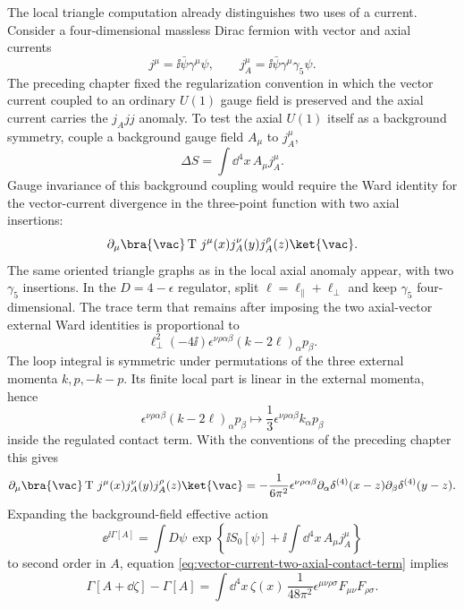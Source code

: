 The local triangle computation already distinguishes two uses of a current.
Consider a four-dimensional massless Dirac fermion with vector and axial
currents
\[
  j^\mu=\ii\bar\psi\gamma^\mu\psi,
  \qquad
  j_A^\mu=\ii\bar\psi\gamma^\mu\gamma_5\psi .
\]
The preceding chapter fixed the regularization convention in which the vector
current coupled to an ordinary \(U(1)\) gauge field is preserved and the axial
current carries the \(j_Ajj\) anomaly.  To test the axial \(U(1)\) itself as a
background symmetry, couple a background gauge field \(A_\mu\) to \(j_A^\mu\),
\[
  \Delta S=\int\dd^4x\,A_\mu j_A^\mu .
\]
Gauge invariance of this background coupling would require the Ward identity
for the vector-current divergence in the three-point function with two axial
insertions:
\[
  \partial_\mu
  \bra{\vac}
  \operatorname T\,j^\mu(x)j_A^\nu(y)j_A^\rho(z)
  \ket{\vac} .
\]
The same oriented triangle graphs as in the local axial anomaly appear, with
two \(\gamma_5\) insertions.  In the \(D=4-\epsilon\) regulator, split
\(\ell=\ell_\parallel+\ell_\perp\) and keep \(\gamma_5\) four-dimensional.
The trace term that remains after imposing the two axial-vector external Ward
identities is proportional to
\[
  \ell_\perp^2(-4\ii)\epsilon^{\nu\rho\alpha\beta}
  (k-2\ell)_\alpha p_\beta .
\]
The loop integral is symmetric under permutations of the three external
momenta \(k,p,-k-p\).  Its finite local part is linear in the external
momenta, hence
\[
  \epsilon^{\nu\rho\alpha\beta}(k-2\ell)_\alpha p_\beta
  \longmapsto
  \frac13\epsilon^{\nu\rho\alpha\beta}k_\alpha p_\beta
\]
inside the regulated contact term.  With the conventions of the preceding
chapter this gives
\begin{equation}
  \partial_\mu
  \bra{\vac}
  \operatorname T\,j^\mu(x)j_A^\nu(y)j_A^\rho(z)
  \ket{\vac}
  =
  -\frac1{6\pi^2}
  \epsilon^{\nu\rho\alpha\beta}
  \partial_\alpha\delta^{(4)}(x-z)
  \partial_\beta\delta^{(4)}(y-z).
  \label{eq:vector-current-two-axial-contact-term}
\end{equation}
Expanding the background-field effective action
\[
  \ee^{\ii\Gamma[A]}
  =
  \int D\psi\,
  \exp\left\{\ii S_0[\psi]
    +\ii\int\dd^4x\,A_\mu j_A^\mu\right\}
\]
to second order in \(A\), equation
\eqref{eq:vector-current-two-axial-contact-term} implies
\begin{equation}
  \Gamma[A+\dd\zeta]-\Gamma[A]
  =
  \int\dd^4x\,\zeta(x)\,
  \frac1{48\pi^2}
  \epsilon^{\mu\nu\rho\sigma}
  F_{\mu\nu}F_{\rho\sigma}.
  \label{eq:axial-background-gauge-variation}
\end{equation}

